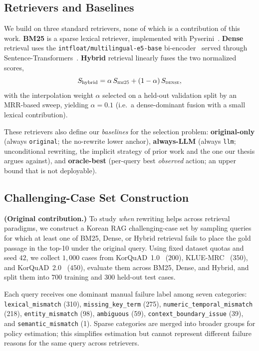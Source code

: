 \documentclass{article}
\begin{document}
\subsection{Retrievers and Baselines}
\label{sec:retrievers}

We build on three standard retrievers, none of which is a contribution of this
work. \textbf{BM25} is a sparse lexical retriever, implemented with
Pyserini~\cite{lin2021pyserini}. \textbf{Dense} retrieval uses the
\texttt{intfloat/multilingual-e5-base} bi-encoder~\cite{wang2024me5} served
through Sentence-Transformers~\cite{reimers2019sbert}. \textbf{Hybrid} retrieval
linearly fuses the two normalized scores,
\begin{equation}
S_{\text{hybrid}} = \alpha\, S_{\textsc{bm25}} + (1-\alpha)\, S_{\textsc{dense}},
\label{eq:hybrid}
\end{equation}
with the interpolation weight $\alpha$ selected on a held-out validation split
by an MRR-based sweep, yielding $\alpha = 0.1$ (i.e.\ a dense-dominant fusion
with a small lexical contribution).

These retrievers also define our \emph{baselines} for the selection problem:
\textbf{original-only} (always \texttt{original}; the no-rewrite lower anchor),
\textbf{always-LLM} (always \texttt{llm}; unconditional rewriting, the implicit
strategy of prior work and the one our thesis argues against), and
\textbf{oracle-best} (per-query best \emph{observed} action; an upper bound that
is not deployable).

\subsection{Challenging-Case Set Construction}
\label{sec:hardcase}

\textbf{(Original contribution.)}
To study \emph{when} rewriting helps across retrieval paradigms, we construct a
Korean RAG challenging-case set by sampling queries for which at least one of
BM25, Dense, or Hybrid retrieval fails to place the gold passage in the top-10
under the original query. Using fixed dataset quotas and seed $42$, we collect
$1{,}000$ cases from KorQuAD~1.0~\cite{lim2019korquad} ($200$),
KLUE-MRC~\cite{park2021klue} ($350$), and
KorQuAD~2.0~\cite{kim2019korquad2} ($450$), evaluate them across BM25, Dense,
and Hybrid, and split them into $700$ training and $300$ held-out test cases.

Each query receives one dominant manual failure label among seven categories:
\texttt{lexical\_mismatch} (310), \texttt{missing\_key\_term} (275),
\texttt{numeric\_temporal\_mismatch} (218), \texttt{entity\_mismatch} (98),
\texttt{ambiguous} (59), \texttt{context\_boundary\_issue} (39), and
\texttt{semantic\_mismatch} (1). Sparse categories are merged into broader
groups for policy estimation; this simplifies estimation but cannot represent
different failure reasons for the same query across retrievers.
\end{document}
